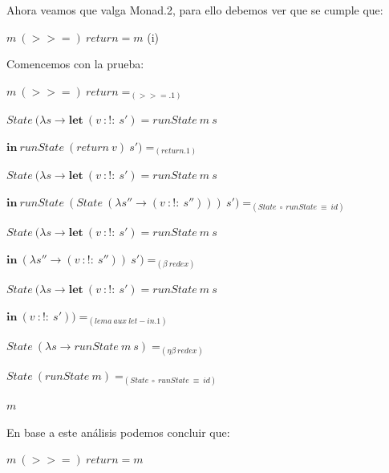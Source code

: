 \begin{flushleft}
Ahora veamos que valga Monad.2, para ello debemos ver que se cumple que:

  \begin{center}
    $m\ (>>=)\ return = m$ (i)
  \end{center}

Comencemos con la prueba:\emptyline

  \hspace{5mm} $m\ (>>=)\ return =_{(>>=.1)}$

  \hspace{5mm} $State\ (\lambda s \rightarrow \textbf{let}\ (v\ :!:\ s') = runState\ m\ s$
  
    \hspace{25.5mm} $\textbf{in}\ runState\ (return\ v)\ s') =_{(return.1)}$

  \hspace{5mm} $State\ (\lambda s \rightarrow \textbf{let}\ (v\ :!:\ s') = runState\ m\ s$
  
    \hspace{25.5mm} $\textbf{in}\ runState\ (State\ (\lambda s'' \rightarrow (v\ :!:\ s'')))\ s') =_{(State\ \circ\ runState\ \equiv\ id)}$

  \hspace{5mm} $State\ (\lambda s \rightarrow \textbf{let}\ (v\ :!:\ s') = runState\ m\ s$
  
    \hspace{25.5mm} $\textbf{in}\ (\lambda s'' \rightarrow (v\ :!:\ s''))\ s') =_{(\beta\ redex)}$

  \hspace{5mm} $State\ (\lambda s \rightarrow \textbf{let}\ (v\ :!:\ s') = runState\ m\ s$
    
    \hspace{25.5mm} $\textbf{in}\ (v\ :!:\ s')) =_{(lema\ aux\ let-in.1)}$

  \hspace{5mm} $State\ (\lambda s \rightarrow runState\ m\ s) =_{(\eta\beta \ redex)}$

  \hspace{5mm} $State\ (runState\ m) =_{(State\ \circ\ runState\ \equiv\ id)}$
  
  \hspace{5mm} $m$\emptyline

En base a este análisis podemos concluir que:

  \begin{center}
    $m\ (>>=)\ return = m$
  \end{center}


\end{flushleft}
